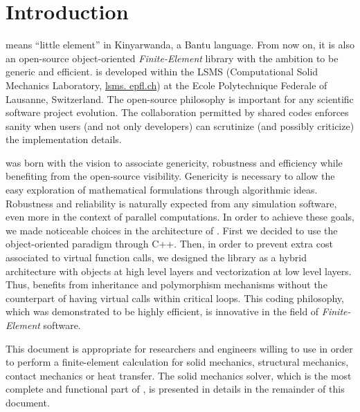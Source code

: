 \chapter{Introduction}

\akantu means ``little element'' in Kinyarwanda, a Bantu
language. From now on, it is also an open-source object-oriented
\emph{Finite-Element} library with the ambition to be generic and
efficient.  \akantu is developed within the LSMS (Computational Solid
Mechanics Laboratory, \url{lsms.  epfl.ch}) at the Ecole Polytechnique
Federale of Lausanne, Switzerland. The open-source philosophy is
important for any scientific software project evolution. The
collaboration permitted by shared codes enforces sanity when users
(and not only developers) can scrutinize (and possibly criticize) the
implementation details.

\akantu was born with the vision to associate genericity, robustness
and efficiency while benefiting from the open-source
visibility. Genericity is necessary to allow the easy exploration of
mathematical formulations through algorithmic ideas. Robustness and
reliability is naturally expected from any simulation software, even
more in the context of parallel computations.  In order to achieve
these goals, we made noticeable choices in the architecture of
\akantu. First we decided to use the object-oriented paradigm through
C++. Then, in order to prevent extra cost associated to virtual
function calls, we designed the library as a hybrid architecture with
objects at high level layers and vectorization at low level
layers. Thus, \akantu benefits from inheritance and polymorphism
mechanisms without the counterpart of having virtual calls within
critical loops.  This coding philosophy, which was demonstrated to be
highly efficient, is innovative in the field of
\textit{Finite-Element} software.

This document is appropriate for researchers and engineers willing to
use \akantu in order to perform a finite-element calculation for solid
mechanics, structural mechanics, contact mechanics or heat
transfer. The solid mechanics solver, which is the most complete and
functional part of \akantu, is presented in details in the remainder
of this document.
